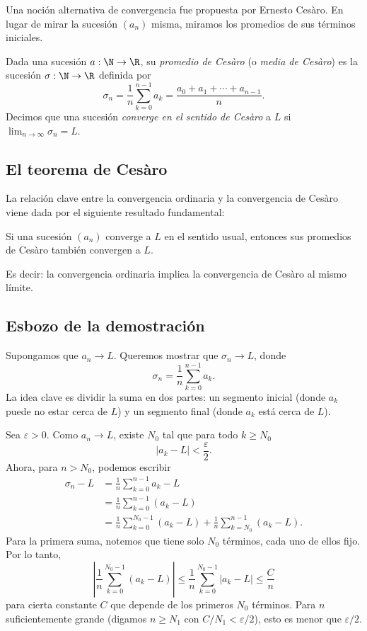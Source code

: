 Una noción alternativa de convergencia fue propuesta por Ernesto Cesàro. En lugar de mirar la sucesión $(a_n)$ misma, miramos los promedios de sus términos iniciales.

\begin{definicion}
Dada una sucesión $a : \N \to \R$, su \emph{promedio de Cesàro} (o \emph{media de Cesàro}) es la sucesión $\sigma : \N \to \R$ definida por
\[
  \sigma_n = \frac1n \sum_{k=0}^{n-1} a_k = \frac{a_0 + a_1 + \cdots + a_{n-1}}{n} .
\]
Decimos que una sucesión \emph{converge en el sentido de Cesàro} a $L$ si $\lim_{n\to\infty} \sigma_n = L$.
\end{definicion}

\subsection{El teorema de Cesàro}

La relación clave entre la convergencia ordinaria y la convergencia de Cesàro viene dada por el siguiente resultado fundamental:

\begin{teorema}[Cesàro]
Si una sucesión $(a_n)$ converge a $L$ en el sentido usual, entonces sus promedios de Cesàro también convergen a $L$.
\end{teorema}

Es decir: la convergencia ordinaria implica la convergencia de Cesàro al mismo límite.

\subsection{Esbozo de la demostración}

Supongamos que $a_n \to L$. Queremos mostrar que $\sigma_n \to L$, donde
\[
  \sigma_n = \frac1n \sum_{k=0}^{n-1} a_k .
\]
La idea clave es dividir la suma en dos partes: un segmento inicial (donde $a_k$ puede no estar cerca de $L$) y un segmento final (donde $a_k$ está cerca de $L$).

Sea $\varepsilon > 0$. Como $a_n \to L$, existe $N_0$ tal que para todo $k \ge N_0$
\[
  |a_k - L| < \frac{\varepsilon}{2} .
\]
Ahora, para $n > N_0$, podemos escribir
\begin{align*}
  \sigma_n - L &= \frac1n \sum_{k=0}^{n-1} a_k - L\\
  &= \frac1n \sum_{k=0}^{n-1} (a_k - L)\\
  &= \frac1n \sum_{k=0}^{N_0-1} (a_k - L) + \frac1n \sum_{k=N_0}^{n-1} (a_k - L) .
\end{align*}
Para la primera suma, notemos que tiene solo $N_0$ términos, cada uno de ellos fijo. Por lo tanto,
\[
  \left| \frac1n \sum_{k=0}^{N_0-1} (a_k - L) \right|
  \le \frac1n \sum_{k=0}^{N_0-1} |a_k - L| \le \frac{C}{n}
\]
para cierta constante $C$ que depende de los primeros $N_0$ términos. Para $n$ suficientemente grande (digamos $n \ge N_1$ con $C/N_1 < \varepsilon/2$), esto es menor que $\varepsilon/2$.

